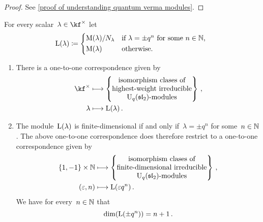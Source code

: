 \documentclass[a4paper, 11pt, oneside]{scrartcl}
\begin{document}
\begin{proof}
  See \cref{proof of understanding quantum verma modules}.
\end{proof}

\begin{definition}
  For every scalar~$\lambda \in \kf^\times$ let
  \[
    \irred(\lambda)
    \defined
    \begin{cases*}
        \verma(\lambda) / N_\lambda
        &
        if~$\lambda = \pm q^n$ for some~$n \in \Natural$,
        \\
        \verma(\lambda)
        &
        otherwise.
    \end{cases*}
  \]
\end{definition}

\begin{theorem}
  \leavevmode
  \begin{enumerate}
    \item
      There is a one-to-one correspondence given by
      \begin{align*}
        \kf^\times
        &\longmapsto
        \left\{
          \begin{tabular}{@{}c@{}}
            isomorphism clases of \\
            highest-weight irreducible \\
            \modules{$\Univ_q(\sllie_2)$}
          \end{tabular}
        \right\} \,,
        \\
        \lambda
        &\longmapsto
        \irred(\lambda) \,.
      \end{align*}
    \item
      The module~$\operatorname{L}(\lambda)$ is finite-dimensional if and only if~$\lambda = \pm q^n$ for some~$n \in \mathbb{N}$.
      The above one-to-one correspondence does therefore restrict to a one-to-one correspondence given by
      \begin{align*}
        \{ 1, -1 \} \times \Natural
        &\longmapsto
        \left\{
          \begin{tabular}{@{}c@{}}
            isomorphism clases of \\
            finite-dimensional irreducible \\
            \modules{$\Univ_q(\sllie_2)$}
          \end{tabular}
        \right\} \,,
        \\
        (\varepsilon, n)
        &\longmapsto
        \irred(\varepsilon q^n) \,.
      \end{align*}
      We have for every~$n \in \mathbb{N}$ that
      \[
        \dim(\operatorname{L}(\pm q^n))
        =
        n + 1 \,.
      \]
  \end{enumerate}
\end{theorem}
\end{document}
